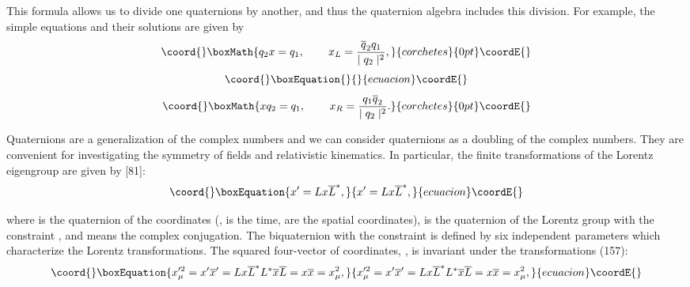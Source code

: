 \documentclass[a4paper,12pt]{article}
\begin{document}
This formula allows us to divide one quaternions by another, and thus the
quaternion algebra includes this division. For example, the simple equations
and their solutions are given by
\[\coord{}\boxMath{
q_2x=q_1,\hspace{0.3in}x_L=\frac{\overline{q}_2q_1}{\mid q_2\mid ^2},
}{corchetes}{0pt}\coordE{}\]
\vspace{-8mm}
\begin{equation}\coord{}\boxEquation{  \label{156}
}{  }{ecuacion}\coordE{}\end{equation}
\vspace{-8mm}
\[\coord{}\boxMath{
xq_2=q_1,\hspace{0.3in}x_R=\frac{q_1\overline{q}_2}{\mid q_2\mid
^2}.
}{corchetes}{0pt}\coordE{}\]

Quaternions are a generalization of the complex numbers and we can
consider quaternions as a doubling of the complex numbers. They
are convenient for investigating the symmetry of fields and
relativistic kinematics. In particular, the finite transformations
of the Lorentz eigengroup are given by [81]:
\begin{equation}\coord{}\boxEquation{
x^{\prime }=Lx\overline{L}^{*},  \label{157}
}{
x^{\prime }=Lx\overline{L}^{*},  }{ecuacion}\coordE{}\end{equation}

where \coordHE{} is the quaternion of the coordinates
(\coordHE{}, \coordHE{} is the time, \coordHE{} are the spatial coordinates),
\coordHE{} is the quaternion of the Lorentz group with the constraint
\coordHE{}, \coordHE{} and
\myHighlight{$*$}\coordHE{} means the complex conjugation. The biquaternion \coordHE{} with the
constraint \coordHE{} is defined by six independent
parameters which characterize the Lorentz transformations. The
squared four-vector of coordinates, \coordHE{}, is invariant under
the transformations (157):
\begin{equation}\coord{}\boxEquation{
x_\mu ^{\prime 2}=x^{\prime }\overline{x}^{\prime
}=Lx\overline{L}^{*}L^{*}
\overline{x}\overline{L}=x\overline{x}=x_\mu ^2,  \label{158}
}{
x_\mu ^{\prime 2}=x^{\prime }\overline{x}^{\prime
}=Lx\overline{L}^{*}L^{*}
\overline{x}\overline{L}=x\overline{x}=x_\mu ^2,  }{ecuacion}\coordE{}\end{equation}
\end{document}
